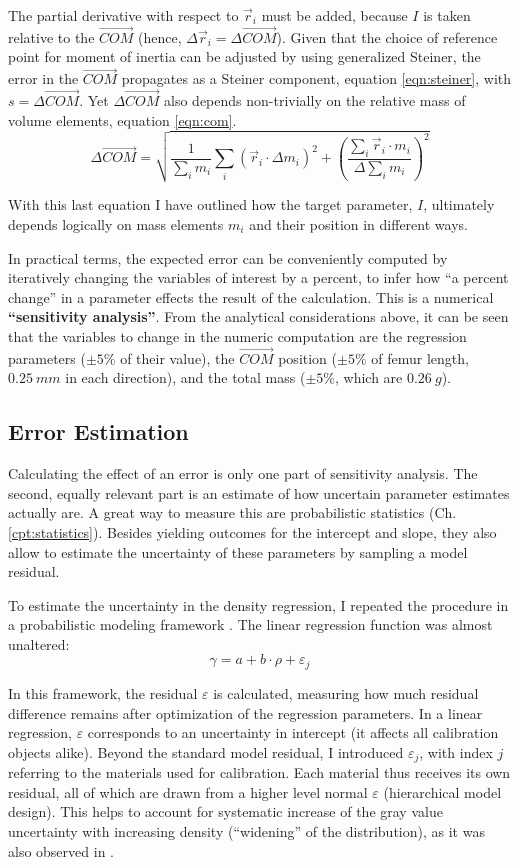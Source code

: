 The partial derivative with respect to \(\vec{r}_{i}\) must be added, because \(I\) is taken relative to the \(\vec{COM}\) (hence, \(\Delta \vec{r}_i = \Delta \vec{COM}\)).
Given that the choice of reference point for moment of inertia can be adjusted by using generalized Steiner, the error in the \(\vec{COM}\) propagates as a Steiner component, equation \eqref{eqn:steiner}, with \(s=\Delta \vec{COM}\).
Yet \(\Delta \vec{COM}\) also depends non-trivially on the relative mass of volume elements, equation \eqref{eqn:com}.
\[ \Delta \vec{COM} = \sqrt{ \frac{1}{\sum_i m_{i}} \sum\limits_{i} \left( \vec{r}_{i} \cdot \Delta m_{i} \right)^2  + \left( \frac{ \sum\limits_{i} \vec{r}_{i} \cdot m_{i} }{\Delta \sum_i m_{i} }\right)^{2}}\]


With this last equation I have outlined how the target parameter, \(I\), ultimately depends logically on mass elements \(m_{i}\) and their position in different ways.


In practical terms, the expected error can be conveniently computed by iteratively changing the variables of interest by a percent, to infer how ``a percent change'' in a parameter effects the result of the calculation.
This is a numerical \textbf{``sensitivity analysis''}.
From the analytical considerations above, it can be seen that the variables to change in the numeric computation are the regression parameters (\(\pm 5 \%\) of their value), the \(\vec{COM}\) position (\(\pm 5 \%\) of femur length, \(0.25\ mm\) in each direction), and the total mass (\(\pm 5 \%\), which are \(0.26\ g\)).


\subsection{Error Estimation}
\label{sec:orgf7759f3}
Calculating the effect of an error is only one part of sensitivity analysis.
The second, equally relevant part is an estimate of how uncertain parameter estimates actually are.
A great way to measure this are probabilistic statistics (Ch. \ref{cpt:statistics}).
Besides yielding outcomes for the intercept and slope, they also allow to estimate the uncertainty of these parameters by sampling a model residual.


To estimate the uncertainty in the density regression, I repeated the procedure in a probabilistic modeling framework \citep[PyMC, Version 5.6,][]{Salvatier2016}.
The linear regression function was almost unaltered:
\[\gamma = a+b\cdot\rho + \varepsilon_{j}\]


In this framework, the residual \(\varepsilon\) is calculated, measuring how much residual difference remains after optimization of the regression parameters.
In a linear regression, \(\varepsilon\) corresponds to an uncertainty in intercept (it affects all calibration objects alike).
Beyond the standard model residual, I introduced \(\varepsilon_{j}\), with index \(j\) referring to the materials used for calibration.
Each material thus receives its own residual, all of which are drawn from a higher level normal \(\varepsilon\) (hierarchical model design).
This helps to account for systematic increase of the gray value uncertainty with increasing density (``widening'' of the distribution), as it was also observed in \citet{DuPlessis2013}.

